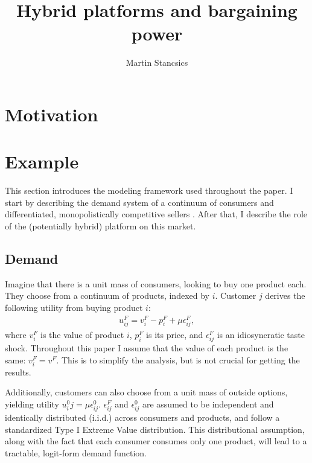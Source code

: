 \documentclass[a4paper]{article}
\title{Hybrid platforms and bargaining power}
\author{Martin Stancsics}
\begin{document}
\maketitle

\begin{abstract}
\end{abstract}


\section{Motivation}


\section{Example}
\label{sec:model}

This section introduces the modeling framework used throughout the paper.
I start by describing the demand system of a continuum of consumers and differentiated, monopolistically competitive sellers \parencite[]{anderson2021hybrid}.
After that, I describe the role of the (potentially hybrid) platform on this market.

\subsection{Demand}

Imagine that there is a unit mass of consumers, looking to buy one product each.
They choose from a continuum of products, indexed by $i$.
Customer $j$ derives the following utility from buying product $i$:
\begin{align*}
    u^F_{ij} = v^F_i - p^F_i + \mu\epsilon^F_{ij},
\end{align*}
where $v^F_i$ is the value of product $i$, $p^F_i$ is its price, and $\epsilon^F_{ij}$ is an idiosyncratic taste shock.
Throughout this paper I assume that the value of each product is the same: $v^F_i = v^F$.
This is to simplify the analysis, but is not crucial for getting the results.  %

Additionally, customers can also choose from a unit mass of outside options, yielding utility $u^0_ij = \mu\epsilon^0_{ij}$. $\epsilon^F_{ij}$ and $\epsilon^0_{ij}$ are assumed to be independent and identically distributed (i.i.d.) across consumers and products, and follow a standardized Type I Extreme Value distribution. This distributional assumption, along with the fact that each consumer consumes only one product, will lead to a tractable, logit-form demand function.
\end{document}
